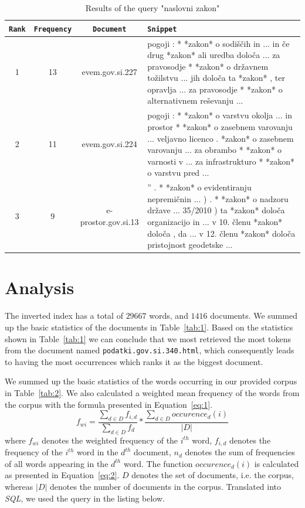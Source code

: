 \documentclass{article}
\begin{document}
	\begin{table}[!hbt]
		\centering
		\begin{tabularx}{\textwidth}{c|c|c|X}
			\texttt{Rank} & \texttt{Frequency} & \texttt{Document} & \texttt{Snippet}  \\ \hline
			1& 13 & evem.gov.si.227& pogoji : * *zakon* o sodiščih in ... in če drug *zakon* ali uredba določa ... za pravosodje * *zakon* o državnem tožilstvu ... jih določa ta *zakon* , ter opravlja ... za pravosodje * *zakon* o alternativnem reševanju ...  \\ \hline
			2& 11 & evem.gov.si.224 & pogoji : * *zakon* o varstvu okolja ... in prostor * *zakon* o zasebnem varovanju ... veljavno licenco . *zakon* o zasebnem varovanju ... za obrambo * *zakon* o varnosti v ... za infrastrukturo * *zakon* o varstvu pred ... \\ \hline
			3 & 9 & e-prostor.gov.si.13 &'' . * *zakon* o evidentiranju nepremičnin ... ) . * *zakon* o nadzoru države ... 35/2010 ) ta *zakon* določa organizacijo in ... v 10. členu *zakon* določa , da ... v 12. členu *zakon* določa pristojnost geodetske ...                                                        
		\end{tabularx}
		\caption{Results of the query "naslovni zakon"}
		\label{tab:5}
	\end{table}
	
	\section{Analysis} \label{sec:analysis}
	
	The inverted index has a total of $29667$ words, and $1416$ documents. 
	We summed up the basic statistics of the documents in Table~\ref{tab:1}. Based on the statistics shown in Table~\ref{tab:1} we can conclude that we most retrieved the most tokens from the document named \texttt{podatki.gov.si.340.html}, which consequently leads to having the most occurrences which ranks it as the biggest document.
	
	We summed up the basic statistics of the words occurring in our provided corpus in Table~\ref{tab:2}. We also calculated a weighted mean frequency of the words from the corpus with the formula presented in Equation~\ref{eq:1}.
	\begin{equation}\label{eq:1}
	f_{wi} = \frac{\scriptstyle \sum_{d \in D} f_{i,d}}{\scriptstyle \sum_{d \in D} f_d} * \frac{\scriptstyle \sum_{d \in D} occurence_d(i)}{|D|}
	\end{equation}
	where $f_{wi}$ denotes the weighted frequency of the $i^{th}$ word, $f_{i,d}$ denotes the frequency of the $i^{th}$ word in the $d^{th}$ document, $n_d$ denotes the sum of frequencies of all words appearing in the $d^{th}$ word. The function $occurence_d(i)$ is calculated as presented in Equation~\ref{eq:2}. $D$ denotes the set of documents, i.e. the corpus, whereas $|D|$ denotes the number of documents in the corpus. Translated into \textit{SQL}, we used the query in the listing below.
	
\end{document}
